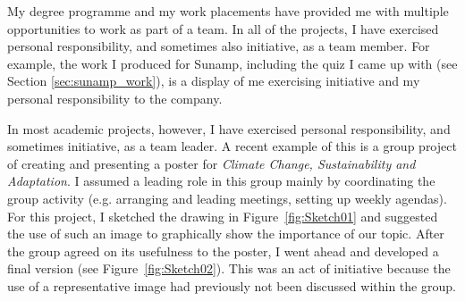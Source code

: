 My degree programme and my work placements have provided me with multiple opportunities to work as part of a team.
In all of the projects, I have exercised personal responsibility, and sometimes also initiative, as a team member.
For example, the work I produced for Sunamp, including the quiz I came up with (see Section \ref{sec:sunamp_work}), is a display of me exercising initiative and my personal responsibility to the company.

In most academic projects, however, I have exercised personal responsibility, and sometimes initiative, as a team leader.
A recent example of this is a group project of creating and presenting a poster for \textit{Climate Change, Sustainability and Adaptation}.
I assumed a leading role in this group mainly by coordinating the group activity (e.g. arranging and leading meetings, setting up weekly agendas).
For this project, I sketched the drawing in Figure~\ref{fig:Sketch01} and suggested the use of such an image to graphically show the importance of our topic.
After the group agreed on its usefulness to the poster, I went ahead and developed a final version (see Figure~\ref{fig:Sketch02}).
This was an act of initiative because the use of a representative image had previously not been discussed within the group.


